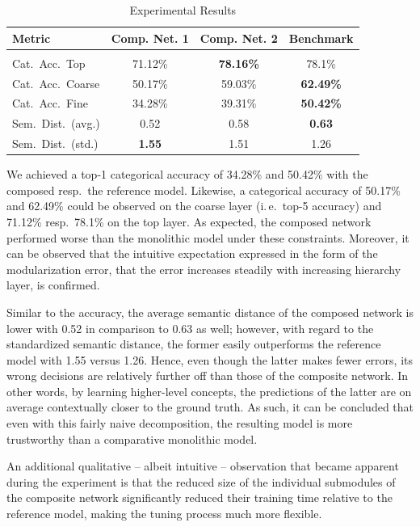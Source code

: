 \documentclass[conference]{IEEEtran}
\begin{document}
\begin{table}[tb]
    \centering
    \caption{Experimental Results}
    \begin{tabular}{|l|c|c|c|}
        \hline
        \textbf{Metric} & \textbf{Comp. Net. 1} & \textbf{Comp. Net. 2} & \textbf{Benchmark}\\
        \hline
        \multicolumn{3}{c}{} \\[-2ex]
        \hline
        Cat.\ Acc.\ Top & 71.12\% & \textbf{78.16\%} & 78.1\% \\
        \hline
        Cat.\ Acc.\ Coarse & 50.17\% & 59.03\% & \textbf{62.49\%} \\
        \hline
        Cat.\ Acc.\ Fine & 34.28\% & 39.31\% & \textbf{50.42\%} \\
        \hline
        Sem.\ Dist.\ (avg.) & 0.52 & 0.58 & \textbf{0.63} \\
        \hline
        Sem.\ Dist.\ (std.) & \textbf{1.55} & 1.51 & 1.26 \\
        \hline
    \end{tabular}
    \label{tab:experiments_results}
\end{table}

We achieved a top-1 categorical accuracy of 34.28\% and 50.42\% with the composed resp.\ the reference model. Likewise, a categorical accuracy of 50.17\% and 62.49\% could be observed on the coarse layer (i.\,e.\ top-5 accuracy) and 71.12\% resp.\ 78.1\% on the top layer. As expected, the composed network performed worse than the monolithic model under these constraints. Moreover, it can be observed that the intuitive expectation expressed in the form of the modularization error, that the error increases steadily with increasing hierarchy layer, is confirmed.

Similar to the accuracy, the average semantic distance of the composed network is lower with 0.52 in comparison to 0.63 as well; however, with regard to the standardized semantic distance, the former easily outperforms the reference model with 1.55 versus 1.26. Hence, even though the latter makes fewer errors, its wrong decisions are relatively further off than those of the composite network. In other words, by learning higher-level concepts, the predictions of the latter are on average contextually closer to the ground truth. As such, it can be concluded that even with this fairly naive decomposition, the resulting model is more trustworthy than a comparative monolithic model.

An additional qualitative -- albeit intuitive -- observation that became apparent during the experiment is that the reduced size of the individual submodules of the composite network significantly reduced their training time relative to the reference model, making the tuning process much more flexible.
\end{document}

